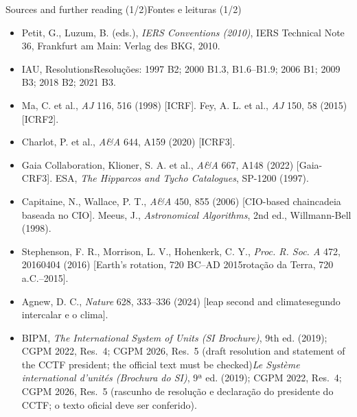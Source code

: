 \documentclass[aspectratio=169,11pt]{beamer}
\newcommand{\tr}[2]{\ifEN#2\else#1\fi}
\begin{document}
\begin{frame}{\tr{Fontes e leituras (1/2)}{Sources and further reading (1/2)}}
  \scriptsize
  \begin{itemize}
    \setlength{\itemsep}{1.5pt}
    \item Petit, G., Luzum, B. (eds.), \emph{IERS Conventions (2010)}, IERS Technical Note 36, Frankfurt am Main: Verlag des BKG, 2010.
    \item IAU, \tr{Resoluções}{Resolutions}: 1997 B2; 2000 B1.3, B1.6--B1.9; 2006 B1; 2009 B3; 2018 B2; 2021 B3.
    \item Ma, C. et al., \emph{AJ} 116, 516 (1998) [ICRF]. Fey, A. L. et al., \emph{AJ} 150, 58 (2015) [ICRF2].
    \item Charlot, P. et al., \emph{A\&A} 644, A159 (2020) [ICRF3].
    \item Gaia Collaboration, Klioner, S. A. et al., \emph{A\&A} 667, A148 (2022) [Gaia-CRF3]. ESA, \emph{The Hipparcos and Tycho Catalogues}, SP-1200 (1997).
    \item Capitaine, N., Wallace, P. T., \emph{A\&A} 450, 855 (2006) [\tr{cadeia baseada no CIO}{CIO-based chain}]. Meeus, J., \emph{Astronomical Algorithms}, 2nd ed., Willmann-Bell (1998).
    \item Stephenson, F. R., Morrison, L. V., Hohenkerk, C. Y., \emph{Proc. R. Soc. A} 472, 20160404 (2016) [\tr{rotação da Terra, 720 a.C.--2015}{Earth's rotation, 720 BC--AD 2015}].
    \item Agnew, D. C., \emph{Nature} 628, 333--336 (2024) [\tr{segundo intercalar e o clima}{leap second and climate}].
    \item BIPM, \tr{\emph{Le Système international d'unités (Brochura do SI)}, 9ª ed. (2019); CGPM 2022, Res.~4; CGPM 2026, Res.~5 (rascunho de resolução e declaração do presidente do CCTF; o texto oficial deve ser conferido)}{\emph{The International System of Units (SI Brochure)}, 9th ed. (2019); CGPM 2022, Res.~4; CGPM 2026, Res.~5 (draft resolution and statement of the CCTF president; the official text must be checked)}.
  \end{itemize}
\end{frame}
\end{document}
